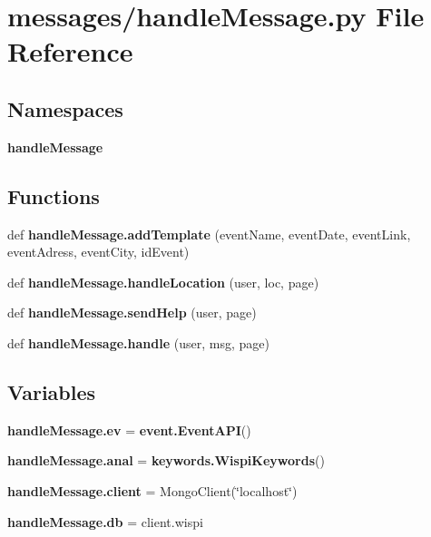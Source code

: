 \section{messages/handle\+Message.py File Reference}
\label{handle_message_8py}
\subsection*{Namespaces}
\begin{DoxyCompactItemize}
\item 
 {\bf handle\+Message}
\end{DoxyCompactItemize}
\subsection*{Functions}
\begin{DoxyCompactItemize}
\item 
def {\bf handle\+Message.\+add\+Template} (event\+Name, event\+Date, event\+Link, event\+Adress, event\+City, id\+Event)
\item 
def {\bf handle\+Message.\+handle\+Location} (user, loc, page)
\item 
def {\bf handle\+Message.\+send\+Help} (user, page)
\item 
def {\bf handle\+Message.\+handle} (user, msg, page)
\end{DoxyCompactItemize}
\subsection*{Variables}
\begin{DoxyCompactItemize}
\item 
{\bf handle\+Message.\+ev} = {\bf event.\+Event\+A\+PI}()
\item 
{\bf handle\+Message.\+anal} = {\bf keywords.\+Wispi\+Keywords}()
\item 
{\bf handle\+Message.\+client} = Mongo\+Client(\char`\"{}localhost\char`\"{})
\item 
{\bf handle\+Message.\+db} = client.\+wispi
\end{DoxyCompactItemize}
